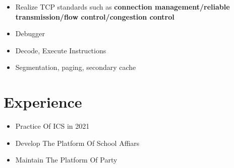 \documentclass{resume}
\begin{document}
\begin{itemize}
  \item Realize TCP standards such as \textbf{connection management/reliable transmission/flow control/congestion control}
\end{itemize}

\begin{itemize}
  \item Debugger
  \item Decode, Execute Instructions
  \item Segmentation, paging, secondary cache
\end{itemize}

\section{Experience}
\begin{itemize}
  \item Practice Of ICS in 2021
\end{itemize}

\begin{itemize}
  \item Develop The Platform Of School Affiars
  \item Maintain The Platform Of Party
\end{itemize}

\end{document}
